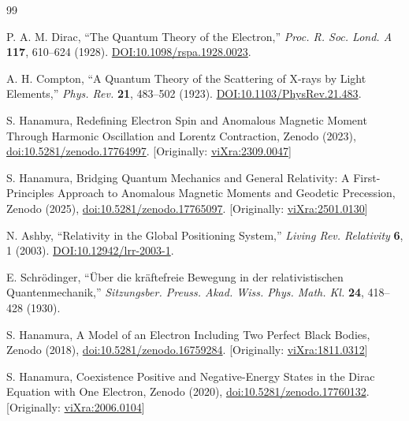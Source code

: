 \documentclass[%
 reprint,
 amsmath,amssymb,
 aps,
]{revtex4-1}
\numberwithin{equation}{section}%
\begin{document}
\begin{thebibliography}{99}


P. A. M. Dirac,
``The Quantum Theory of the Electron,''
\textit{Proc. R. Soc. Lond. A} \textbf{117}, 610--624 (1928).
\href{https://doi.org/10.1098/rspa.1928.0023}{DOI:10.1098/rspa.1928.0023}.

A. H. Compton,
``A Quantum Theory of the Scattering of X-rays by Light Elements,''
\textit{Phys. Rev.} \textbf{21}, 483--502 (1923).
\href{https://doi.org/10.1103/PhysRev.21.483}{DOI:10.1103/PhysRev.21.483}.

S. Hanamura, Redefining Electron Spin and Anomalous Magnetic Moment Through Harmonic Oscillation and Lorentz Contraction, Zenodo (2023), \href{https://doi.org/10.5281/zenodo.17764997}{doi:10.5281/zenodo.17764997}. [Originally: \href{https://vixra.org/abs/2309.0047}{viXra:2309.0047}]

S. Hanamura, Bridging Quantum Mechanics and General Relativity: A First-Principles Approach to Anomalous Magnetic Moments and Geodetic Precession, Zenodo (2025), \href{https://doi.org/10.5281/zenodo.17765097}{doi:10.5281/zenodo.17765097}. [Originally: \href{https://vixra.org/abs/2501.0130}{viXra:2501.0130}]

N. Ashby,
``Relativity in the Global Positioning System,''
\textit{Living Rev. Relativity} \textbf{6}, 1 (2003).
\href{https://doi.org/10.12942/lrr-2003-1}{DOI:10.12942/lrr-2003-1}.

E. Schrödinger,
``Über die kräftefreie Bewegung in der relativistischen Quantenmechanik,''
\textit{Sitzungsber. Preuss. Akad. Wiss. Phys. Math. Kl.} \textbf{24}, 418--428 (1930).

S. Hanamura, A Model of an Electron Including Two Perfect Black Bodies, Zenodo (2018), \href{https://doi.org/10.5281/zenodo.16759284}{doi:10.5281/zenodo.16759284}. [Originally: \href{https://vixra.org/abs/1811.0312}{viXra:1811.0312}]

S. Hanamura, Coexistence Positive and Negative-Energy States in the Dirac Equation with One Electron, Zenodo (2020), \href{https://doi.org/10.5281/zenodo.17760132}{doi:10.5281/zenodo.17760132}. [Originally: \href{https://vixra.org/abs/2006.0104}{viXra:2006.0104}]


\end{thebibliography}
\end{document}
